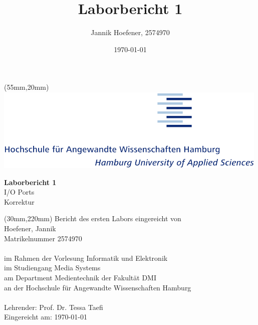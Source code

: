 \documentclass{article}
\title{Laborbericht 1}
\author{Jannik Hoefener, 2574970}
\date{\today}
\begin{document}
\begin{titlepage}

\begin{textblock*}{188mm}(55mm,20mm)
\includegraphics[height=40mm]{images/hawlogo.png}
\end{textblock*}

\vspace*{\fill}
\begin{center}
    \textsf{\textbf{\Huge Laborbericht 1}} \\
    \vspace*{6mm}
    \textsf{\Huge I/O Ports} \\
    \textsf{\Large Korrektur} %
\end{center}
\vspace*{\fill}

\begin{textblock*}{90mm}(30mm,220mm)
\noindent\textsf{Bericht des ersten Labors eingereicht von} \\
\textsf{Hoefener, Jannik} \\
\textsf{Matrikelnummer 2574970} \\
\textsf{ } \\
\textsf{im Rahmen der Vorlesung Informatik und Elektronik } \\
\textsf{im Studiengang Media Systems} \\
\textsf{am Department Medientechnik der Fakultät DMI} \\
\textsf{an der Hochschule für Angewandte Wissenschaften Hamburg} \\
\textsf{ } \\
\textsf{Lehrender: Prof. Dr. Tessa Taefi} \\
\textsf{Eingereicht am: \today} \\
\end{textblock*}

\end{titlepage}
\newpage
\end{document}
